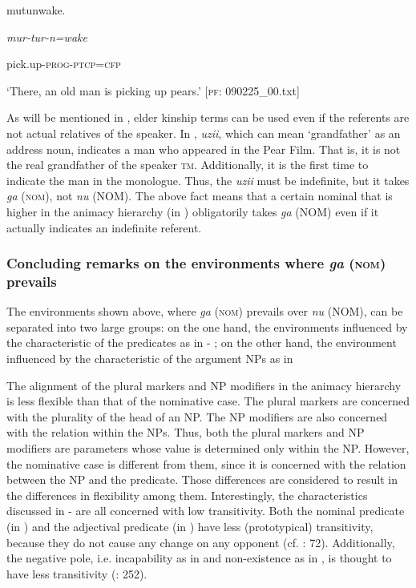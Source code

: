    mutunwake.

    \textit{mur-tur-n=wake}

    pick.up-\textsc{prog}-\textsc{ptcp}=\textsc{cfp}

\glt    ‘There, an old man is picking up pears.’ [\textsc{pf}: 090225\_00.txt]
\z

As will be mentioned in , elder kinship terms can be used even if the referents are not actual relatives of the speaker. In , \textit{uzii}, which can mean ‘grandfather’ as an address noun, indicates a man who appeared in the Pear Film. That is, it is not the real grandfather of the speaker \textsc{tm}. Additionally, it is the first time to indicate the man in the monologue. Thus, the \textit{uzii} must be indefinite, but it takes \textit{ga} (\textsc{nom}), not \textit{nu} (NOM). The above fact means that a certain nominal that is higher in the animacy hierarchy (in ) obligatorily takes \textit{ga} (NOM) even if it actually indicates an indefinite referent.

\subsubsection{Concluding remarks on the environments where \textit{ga} (\textsc{nom}) prevails}

The environments shown above, where \textit{ga} (\textsc{nom}) prevails over \textit{nu} (NOM), can be separated into two large groups: on the one hand, the environments influenced by the characteristic of the predicates as in  - ; on the other hand, the environment influenced by the characteristic of the argument NPs as in 

The alignment of the plural markers and NP modifiers in the animacy hierarchy is less flexible than that of the nominative case. The plural markers are concerned with the plurality of the head of an NP. The NP modifiers are also concerned with the relation within the NPs. Thus, both the plural markers and NP modifiers are parameters whose value is determined only within the NP. However, the nominative case is different from them, since it is concerned with the relation between the NP and the predicate. Those differences are considered to result in the differences in flexibility among them. Interestingly, the characteristics discussed in  -  are all concerned with low transitivity. Both the nominal predicate (in ) and the adjectival predicate (in ) have less (prototypical) transitivity, because they do not cause any change on any opponent (cf. \citealt{Tsunoda1991}: 72). Additionally, the negative pole, i.e. incapability as in  and non-existence as in , is thought to have less transitivity (\citealt{HopperThompson1980}: 252).

